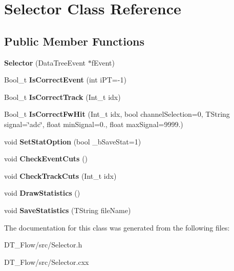 \hypertarget{classSelector}{}\section{Selector Class Reference}
\label{classSelector}
\subsection*{Public Member Functions}
\begin{DoxyCompactItemize}
\item 
\mbox{\label{classSelector_ae573ef6bdae9895891e03aaa6f93ce1a}} 
{\bfseries Selector} (Data\+Tree\+Event $\ast$f\+Event)
\item 
\mbox{\label{classSelector_ac28262916f4a95415a293bbe5d2614b9}} 
Bool\+\_\+t {\bfseries Is\+Correct\+Event} (int i\+PT=-\/1)
\item 
\mbox{\label{classSelector_aef5d50dc431d0efdbaeadd864be64191}} 
Bool\+\_\+t {\bfseries Is\+Correct\+Track} (Int\+\_\+t idx)
\item 
\mbox{\label{classSelector_a77c94f4923bec2a0fbd617cbd7f0c680}} 
Bool\+\_\+t {\bfseries Is\+Correct\+Fw\+Hit} (Int\+\_\+t idx, bool channel\+Selection=0, T\+String signal=\char`\"{}adc\char`\"{}, float min\+Signal=0., float max\+Signal=9999.)
\item 
\mbox{\label{classSelector_a3b3c20fe6d74cc6306f9487d0f5631d4}} 
void {\bfseries Set\+Stat\+Option} (bool \+\_\+b\+Save\+Stat=1)
\item 
\mbox{\label{classSelector_a657a738bf0f523ff4d781fff3f8fab99}} 
void {\bfseries Check\+Event\+Cuts} ()
\item 
\mbox{\label{classSelector_a447add4d4b8626d6f37c5bbb1aa23484}} 
void {\bfseries Check\+Track\+Cuts} (Int\+\_\+t idx)
\item 
\mbox{\label{classSelector_a8e164df289baedd34c75bd4c8e12371e}} 
void {\bfseries Draw\+Statistics} ()
\item 
\mbox{\label{classSelector_a32669965ff4e2545d31e8df8efe5f95a}} 
void {\bfseries Save\+Statistics} (T\+String file\+Name)
\end{DoxyCompactItemize}


The documentation for this class was generated from the following files\+:\begin{DoxyCompactItemize}
\item 
D\+T\+\_\+\+Flow/src/Selector.\+h\item 
D\+T\+\_\+\+Flow/src/Selector.\+cxx\end{DoxyCompactItemize}
